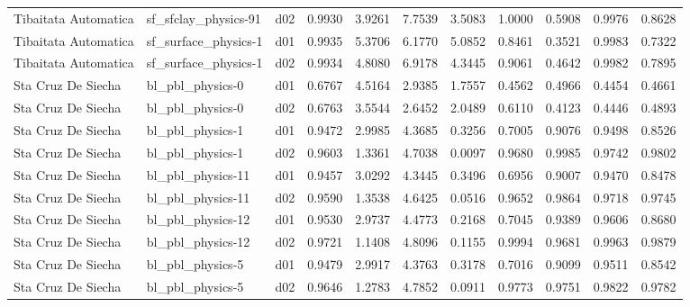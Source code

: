 \begin{longtable}{lllrrrrrrrr}
 Tibaitata Automatica  &  sf\_sfclay\_physics-91 &     d02 &   0.9930 &   3.9261 &   7.7539 &       3.5083 &        1.0000 &       0.5908 &           0.9976 &  0.8628 \\
 Tibaitata Automatica  &  sf\_surface\_physics-1 &     d01 &   0.9935 &   5.3706 &   6.1770 &       5.0852 &        0.8461 &       0.3521 &           0.9983 &  0.7322 \\
 Tibaitata Automatica  &  sf\_surface\_physics-1 &     d02 &   0.9934 &   4.8080 &   6.9178 &       4.3445 &        0.9061 &       0.4642 &           0.9982 &  0.7895 \\
   Sta Cruz De Siecha  &      bl\_pbl\_physics-0 &     d01 &   0.6767 &   4.5164 &   2.9385 &       1.7557 &        0.4562 &       0.4966 &           0.4454 &  0.4661 \\
   Sta Cruz De Siecha  &      bl\_pbl\_physics-0 &     d02 &   0.6763 &   3.5544 &   2.6452 &       2.0489 &        0.6110 &       0.4123 &           0.4446 &  0.4893 \\
   Sta Cruz De Siecha  &      bl\_pbl\_physics-1 &     d01 &   0.9472 &   2.9985 &   4.3685 &       0.3256 &        0.7005 &       0.9076 &           0.9498 &  0.8526 \\
   Sta Cruz De Siecha  &      bl\_pbl\_physics-1 &     d02 &   0.9603 &   1.3361 &   4.7038 &       0.0097 &        0.9680 &       0.9985 &           0.9742 &  0.9802 \\
   Sta Cruz De Siecha  &     bl\_pbl\_physics-11 &     d01 &   0.9457 &   3.0292 &   4.3445 &       0.3496 &        0.6956 &       0.9007 &           0.9470 &  0.8478 \\
   Sta Cruz De Siecha  &     bl\_pbl\_physics-11 &     d02 &   0.9590 &   1.3538 &   4.6425 &       0.0516 &        0.9652 &       0.9864 &           0.9718 &  0.9745 \\
   Sta Cruz De Siecha  &     bl\_pbl\_physics-12 &     d01 &   0.9530 &   2.9737 &   4.4773 &       0.2168 &        0.7045 &       0.9389 &           0.9606 &  0.8680 \\
   Sta Cruz De Siecha  &     bl\_pbl\_physics-12 &     d02 &   0.9721 &   1.1408 &   4.8096 &       0.1155 &        0.9994 &       0.9681 &           0.9963 &  0.9879 \\
   Sta Cruz De Siecha  &      bl\_pbl\_physics-5 &     d01 &   0.9479 &   2.9917 &   4.3763 &       0.3178 &        0.7016 &       0.9099 &           0.9511 &  0.8542 \\
   Sta Cruz De Siecha  &      bl\_pbl\_physics-5 &     d02 &   0.9646 &   1.2783 &   4.7852 &       0.0911 &        0.9773 &       0.9751 &           0.9822 &  0.9782 \\

\end{longtable}
